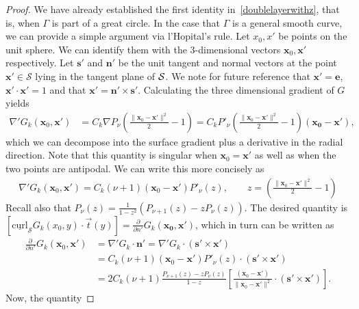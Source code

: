 \documentclass[final]{siamltex}
\newcommand{\C}{C_k}
\renewcommand{\S} {\mathcal{S}}
\begin{document}
\begin{proof}
We have already established the first identity
in~\eqref{doublelayerwithz}, that is, when $\Gamma$ is part of a great circle. In the case that $\Gamma$ is a general
smooth curve, we can provide a simple argument via l'Hopital's rule.
Let $x_0,x'$ be points on the unit sphere. We can identify them with the
3-dimensional vectors ${\mathbf x_0},{\mathbf x'}$ respectively.  Let
${\mathbf s}'$ and ${\mathbf n}'$ be the unit tangent and normal vectors
at the point ${\mathbf x}' \in \mathcal{S}$ lying in the tangent plane
of ${\cal S}$.  We note for future reference that $\mathbf{x'}=\mathbf{e}$,
$\mathbf{x'} \cdot \mathbf{x'} = 1$ and that $\mathbf{x'} = \mathbf{n'}
\times \mathbf{s'}$.  Calculating the three dimensional gradient of $G$
yields
\begin{align*}
  \nabla' G_k({\mathbf x_0},{\mathbf x}') &= \C \nabla P_\nu\left(
    \frac{\|{\mathbf x_0}-{\mathbf x}'\|^2}{2}-1\right) = 
  \C P'_\nu\left(\frac{\|{\mathbf x_0}-{\mathbf x}'\|^2}{2}-1\right)
    (\mathbf{x_0}-\mathbf{x'}),
\end{align*}
which we can decompose into the surface gradient plus a derivative in
the radial direction. Note that this quantity is singular when
$\mathbf{x}_0 = \mathbf{x'}$ as well as when the two points are
antipodal. We can write this more concisely as
\begin{align*}
\nabla' G_k({\mathbf x_0},{\mathbf x}')=\C(\nu+1)(\mathbf{x}_0-\mathbf{x'})P'_{\nu}(z), \qquad 
  z=\left(\frac{\|{\mathbf x_0}-{\mathbf x}'\|^2}{2}-1\right)
\end{align*}
Recall also that 
$P_{\nu}(z)=\frac{1}{1-z^2}(P_{\nu+1}(z)-z P_{\nu}(z))$.  The desired
quantity is $[\underline{\mbox{curl}}_{\S}G_{k}(x_{0},y) \cdot
\vec{t}(y)]= \frac{\partial}{\partial n'}
G_k(\mathbf{x_0},\mathbf{x}')$, which in turn can be written as 
\begin{align}
 \frac{\partial \, }{\partial n'} G_k({\mathbf x}_0,{\mathbf x}') &
 =\nabla' G_k \cdot {\mathbf n}' = \nabla' G_k\cdot \left( \mathbf{s}'
 \times {\mathbf x}' \right) \nonumber \\
 &=\C(\nu+1)(\mathbf{x}_0-\mathbf{x'})P'_{\nu}(z)\cdot \left(
 \mathbf{s}' \times {\mathbf x}' \right) \nonumber\\
 &= 2\C(\nu+1)\frac{P_{\nu+1}(z)-zP_{\nu}(z)}{1-z} \left[
 \frac{(\mathbf{x}_0-\mathbf{x'})}{\|\mathbf{x}_0-\mathbf{x'}\|^2}\cdot
 \left( \mathbf{s}' \times {\mathbf x}' \right)\right].
 \label{kern1}
\end{align} 
Now, the quantity

\end{proof}
\end{document}
